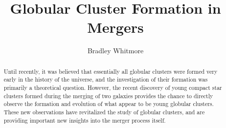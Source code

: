 {{{{{{{{{{{{{{\title{Globular Cluster Formation in Mergers}
\author{Bradley Whitmore}

\begin{abstract}

Until recently, it was believed that essentially all globular clusters
were formed very early in the history of the universe, and the
investigation of their formation was primarily a theoretical
question. However, the recent discovery of young compact star clusters
formed during the merging of two galaxies provides the chance to
directly observe the formation and evolution of what appear to be
young globular clusters. These new observations have revitalized the
study of globular clusters, and are providing important new insights
into the merger process itself.

\end{abstract}


\begin{references}


\end{references}}}}}}}}}}}}}}}
